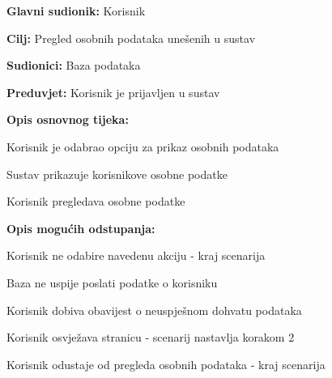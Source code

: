 					\eject

					\noindent {}
					\begin{packed_item}
	
						\item \textbf{Glavni sudionik: }Korisnik
						\item  \textbf{Cilj:} Pregled osobnih podataka unešenih u sustav
						\item  \textbf{Sudionici:} Baza podataka
						\item  \textbf{Preduvjet:} Korisnik je prijavljen u sustav
						\item  \textbf{Opis osnovnog tijeka:}
						
						\item[] \begin{packed_enum}
							\item Korisnik je odabrao opciju za prikaz osobnih podataka
							\item Sustav prikazuje korisnikove osobne podatke 
							\item Korisnik pregledava osobne podatke
						\end{packed_enum}
						\item  \textbf{Opis mogućih odstupanja:}

						\item[] \begin{packed_item}
							\item[1.a] Korisnik ne odabire navedenu akciju - kraj scenarija
							\item[2.a] Baza ne uspije poslati podatke o korisniku
							\item[] \begin{packed_enum}			
								\item Korisnik dobiva obavijest o neuspješnom dohvatu podataka
								\item
									\begin{packed_enum}
										\item Korisnik osvježava stranicu - scenarij nastavlja korakom 2
										\item Korisnik odustaje od pregleda osobnih podataka - kraj scenarija
									\end{packed_enum}						
							\end{packed_enum}	
						\end{packed_item}	
					\end{packed_item}

